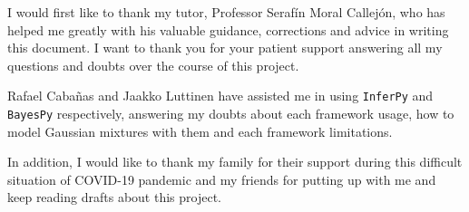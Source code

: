 
I would first like to thank my tutor, Professor Serafín Moral Callejón, who has helped me greatly with his valuable guidance, corrections and advice in writing this document. I want to thank you for your patient support answering all my questions and doubts over the course of this project.

Rafael Cabañas and Jaakko Luttinen have assisted me in using \texttt{InferPy} and \texttt{BayesPy} respectively, answering my doubts about each framework usage, how to model Gaussian mixtures with them and each framework limitations.

In addition, I would like to thank my family for their support during this difficult situation of COVID-19 pandemic and my friends for putting up with me and keep reading drafts about this project.
